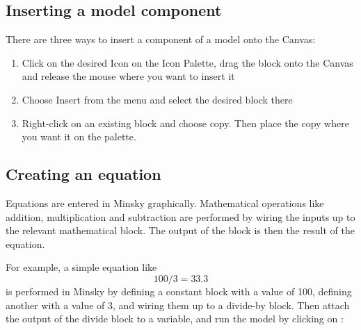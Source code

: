 \subsection{Inserting a model component}


There are three ways to insert a component of a model onto the Canvas:
\begin{enumerate}
\item Click on the desired Icon on the Icon Palette, drag the block
onto the Canvas and release the mouse where you want to insert it 

\begin{center}
\end{center}

\item Choose Insert from the menu and select the desired block there

\begin{center}
\end{center}

\item Right-click on an existing block and choose copy. Then place the
copy where you want it on the palette. 

\begin{center}
\end{center}


\end{enumerate}

\subsection{Creating an equation}

Equations are entered in Minsky graphically. Mathematical operations
like addition, multiplication and subtraction are performed by wiring
the inputs up to the relevant mathematical block. The output of the
block is then the result of the equation. 

For example, a simple equation like
\begin{displaymath}
100/3 = 33.3
\end{displaymath}
is performed in Minsky by defining a constant block with a value of 100, defining another with a value of 3, and wiring them up to a divide-by block. Then attach the output of the divide block to a variable, and run the model by clicking on :


